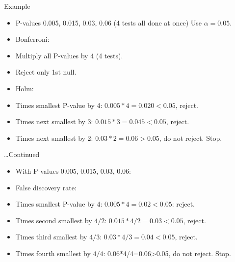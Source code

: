 \documentclass[ignorenonframetext,]{beamer}
\begin{document}
\begin{frame}{Example}
\protect\hypertarget{example}{}

\begin{itemize}
\item
  P-values 0.005, 0.015, 0.03, 0.06 (4 tests all done at once) Use
  \(\alpha=0.05\).
\item
  Bonferroni:
\item
  Multiply all P-values by 4 (4 tests).
\item
  Reject only 1st null.
\item
  Holm:
\item
  Times smallest P-value by 4: \(0.005*4=0.020<0.05\), reject.
\item
  Times next smallest by 3: \(0.015*3=0.045<0.05\), reject.
\item
  Times next smallest by 2: \(0.03*2=0.06>0.05\), do not reject. Stop.
\end{itemize}

\end{frame}

\begin{frame}{\ldots Continued}
\protect\hypertarget{continued}{}

\begin{itemize}
\item
  With P-values 0.005, 0.015, 0.03, 0.06:
\item
  False discovery rate:
\item
  Times smallest P-value by 4: \(0.005*4=0.02<0.05\): reject.
\item
  Times second smallest by \(4/2\): \(0.015*4/2=0.03<0.05\), reject.
\item
  Times third smallest by \(4/3\): \(0.03*4/3=0.04<0.05\), reject.
\item
  Times fourth smallest by \(4/4\): 0.06*4/4=0.06\textgreater{}0.05, do
  not reject. Stop.
\end{itemize}

\end{frame}
\end{document}

